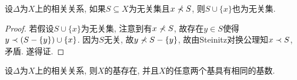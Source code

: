 \begin{proposition}\label{prop:dependlemma}
  设$\Delta$为$X$上的相关关系, 如果$S\subseteq X$为无关集且$x\nprec S$, 则$S\cup\{x\}$也为无关集.
\end{proposition}

\begin{proof}
  若假设$S\cup\{x\}$为无关集, 注意到有$x\nprec S$, 故存在$y\in S$使得$y\prec (S-\{y\})\cup \{x\}$. 因为$S$无关, 故$y\nprec S-\{y\}$, 故由Steinitz对换公理知$x\prec S$, 矛盾. 遂得证.
\end{proof}

\begin{theorem}\label{thm:dependbase}
  设$\Delta$为$X$上的相关关系, 则$X$的基存在, 并且$X$的任意两个基具有相同的基数.
\end{theorem}

